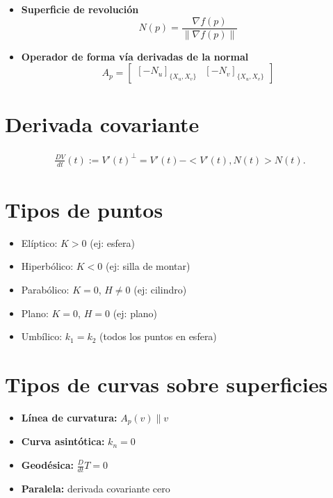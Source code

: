 \documentclass[8pt]{article}
\begin{document}
\begin{multicols}{3}
\begin{itemize}
  \item \textbf{Superficie de revolución} 
  \[
  N(p)=\frac{\nabla f(p)}{\|\nabla f(p)\|}
  \]

  \item \textbf{Operador de forma vía derivadas de la normal} 
  \[
  A_p =
  \begin{bmatrix}
    \left[ -N_u \right]_{\{X_u, X_v\}} &
    \left[ -N_v \right]_{\{X_u, X_v\}}
  \end{bmatrix}
  \]
\end{itemize}
\section*{Derivada covariante}
\begin{align*}
  \frac{DV}{dt}(t):=V'(t)^{\perp}=V'(t)-<V'(t),N(t)>N(t).
\end{align*}
\section*{Tipos de puntos}
\begin{itemize}
  \item El\'iptico: $K > 0$ (ej: esfera)
  \item Hiperb\'olico: $K < 0$ (ej: silla de montar)
  \item Parab\'olico: $K = 0$, $H \neq 0$ (ej: cilindro)
  \item Plano: $K = 0$, $H = 0$ (ej: plano)
  \item Umb\'ilico: $k_1 = k_2$ (todos los puntos en esfera)
\end{itemize}

\section*{Tipos de curvas sobre superficies}
\begin{itemize}
  \item \textbf{L\'inea de curvatura:} $A_p(v) \parallel v$
  \item \textbf{Curva asint\'otica:} $k_n = 0$
  \item \textbf{Geod\'esica:} $\frac{D}{dt} T = 0$
  \item \textbf{Paralela:} derivada covariante cero
\end{itemize}

\end{multicols}
\end{document}
